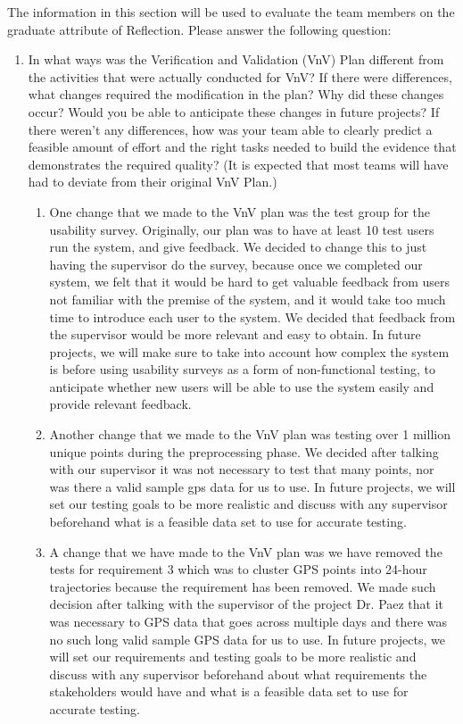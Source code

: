 \documentclass[12pt, titlepage]{article}
\begin{document}
The information in this section will be used to evaluate the team members on the
graduate attribute of Reflection.  Please answer the following question:

\begin{enumerate}
  \item In what ways was the Verification and Validation (VnV) Plan different
  from the activities that were actually conducted for VnV?  If there were
  differences, what changes required the modification in the plan?  Why did
  these changes occur?  Would you be able to anticipate these changes in future
  projects?  If there weren't any differences, how was your team able to clearly
  predict a feasible amount of effort and the right tasks needed to build the
  evidence that demonstrates the required quality?  (It is expected that most
  teams will have had to deviate from their original VnV Plan.)
  \begin{enumerate}
    \item One change that we made to the VnV plan was the test group for the usability survey. Originally, our plan was to have at least 10 test users run the system, and give feedback. We decided to change this to just having the supervisor do the survey, because once we completed our system, we felt that it would be hard to get valuable feedback from users not familiar with the premise of the system, and it would take too much time to introduce each user to the system. We decided that feedback from the supervisor would be more relevant and easy to obtain. In future projects, we will make sure to take into account how complex the system is before using usability surveys as a form of non-functional testing, to anticipate whether new users will be able to use the system easily and provide relevant feedback.
    \item Another change that we made to the VnV plan was testing over 1 million unique points during the preprocessing phase. We decided after talking with our supervisor it was not necessary to test that many points, nor was there a valid sample gps data for us to use. In future projects, we will set our testing goals to be more realistic and discuss with any supervisor beforehand what is a feasible data set to use for accurate testing. 
    \item A change that we have made to the VnV plan was we have removed the tests for requirement 3 which was to cluster GPS points into 24-hour trajectories because the requirement has been removed. We made such decision after talking with the supervisor of the project Dr. Paez that it was necessary to GPS data that goes across multiple days and there was no such long valid sample GPS data for us to use. In future projects, we will set our requirements and testing goals to be more realistic and discuss with any supervisor beforehand about what requirements the stakeholders would have and what is a feasible data set to use for accurate testing. 
  \end{enumerate}

  
\end{enumerate}
\end{document}
